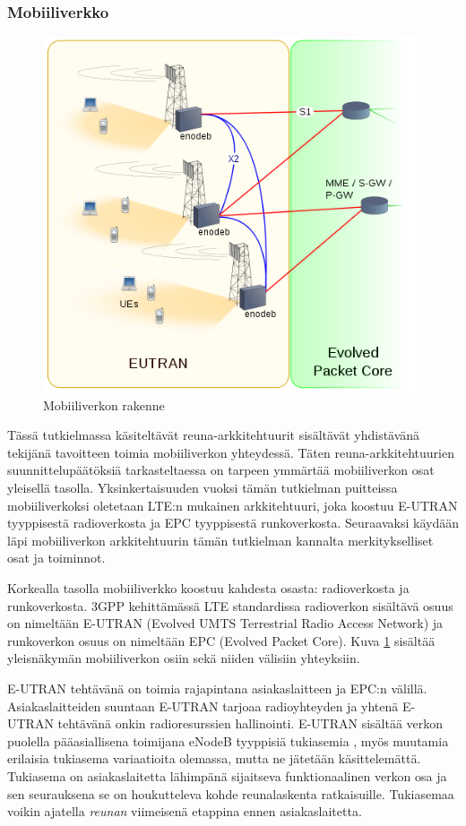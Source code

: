 \subsubsection{Mobiiliverkko}
\begin{figure}[htb]
\includegraphics[scale=0.5]{EUTRAN}
\caption{Mobiiliverkon rakenne} \label{mobiarch}
\end{figure}

Tässä tutkielmassa käsiteltävät reuna-arkkitehtuurit sisältävät yhdistävänä tekijänä tavoitteen toimia mobiiliverkon yhteydessä. 
Täten reuna-arkkitehtuurien suunnittelupäätöksiä tarkasteltaessa on tarpeen ymmärtää mobiiliverkon osat yleisellä tasolla.
Yksinkertaisuuden vuoksi tämän tutkielman puitteissa mobiiliverkoksi oletetaan LTE:n mukainen arkkitehtuuri, joka koostuu E-UTRAN tyyppisestä radioverkosta ja EPC tyyppisestä runkoverkosta.
Seuraavaksi käydään läpi mobiiliverkon arkkitehtuurin tämän tutkielman kannalta merkitykselliset osat ja toiminnot.

Korkealla tasolla mobiiliverkko koostuu kahdesta osasta: radioverkosta ja runkoverkosta. 3GPP kehittämässä LTE standardissa radioverkon sisältävä osuus on nimeltään E-UTRAN (Evolved UMTS Terrestrial Radio Access Network) ja runkoverkon osuus on nimeltään EPC (Evolved Packet Core). Kuva \ref{mobiarch} sisältää yleisnäkymän mobiiliverkon osiin sekä niiden välisiin yhteyksiin.

E-UTRAN tehtävänä on toimia rajapintana asiakaslaitteen ja EPC:n välillä. Asiakaslaitteiden suuntaan E-UTRAN tarjoaa radioyhteyden ja yhtenä E-UTRAN tehtävänä onkin radioresurssien hallinointi. 
E-UTRAN sisältää verkon puolella pääasiallisena toimijana eNodeB tyyppisiä tukiasemia \cite{etsieutran}, myös muutamia erilaisia tukiasema variaatioita olemassa, mutta ne jätetään käsittelemättä.
Tukiasema on asiakaslaitetta lähimpänä sijaitseva funktionaalinen verkon osa ja sen seurauksena se on houkutteleva kohde reunalaskenta ratkaisuille. Tukiasemaa voikin ajatella \textit{reunan} viimeisenä etappina ennen asiakaslaitetta. 

